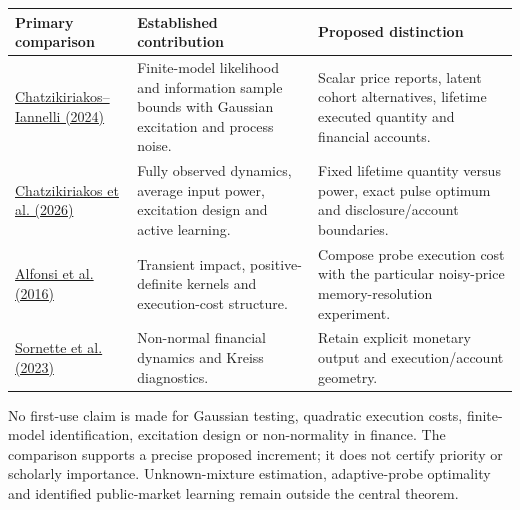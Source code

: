 \documentclass[11pt]{article}
\begin{document}
\begin{center}\small
\begin{tabularx}{\textwidth}{p{3cm}XX}\toprule
Primary comparison & Established contribution & Proposed distinction \\\midrule
\href{https://andreaian.github.io/pub/LCSS_24_FiniteSetBnds.pdf}{Chatzikiriakos--Iannelli (2024)} & Finite-model likelihood and information sample bounds with Gaussian excitation and process noise. & Scalar price reports, latent cohort alternatives, lifetime executed quantity and financial accounts. \\
\href{https://proceedings.mlr.press/v300/chatzikiriakos26a.html}{Chatzikiriakos et al. (2026)} & Fully observed dynamics, average input power, excitation design and active learning. & Fixed lifetime quantity versus power, exact pulse optimum and disclosure/account boundaries. \\
\href{https://arxiv.org/abs/1310.4471}{Alfonsi et al. (2016)} & Transient impact, positive-definite kernels and execution-cost structure. & Compose probe execution cost with the particular noisy-price memory-resolution experiment. \\
\href{https://www.nature.com/articles/s42005-023-01379-7}{Sornette et al. (2023)} & Non-normal financial dynamics and Kreiss diagnostics. & Retain explicit monetary output and execution/account geometry. \\
\bottomrule\end{tabularx}\end{center}

No first-use claim is made for Gaussian testing, quadratic execution costs, finite-model identification, excitation design or non-normality in finance. The comparison supports a precise proposed increment; it does not certify priority or scholarly importance. Unknown-mixture estimation, adaptive-probe optimality and identified public-market learning remain outside the central theorem.
\end{document}
